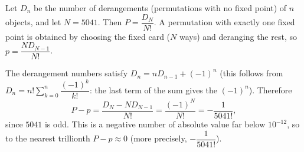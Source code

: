 Let $D_n$ be the number of derangements (permutations with no fixed point) of $n$ objects, and let $N=5041$. Then $P=\dfrac{D_N}{N!}$. A permutation with exactly one fixed point is obtained by choosing the fixed card ($N$ ways) and deranging the rest, so $p=\dfrac{N D_{N-1}}{N!}$.

The derangement numbers satisfy $D_n=nD_{n-1}+(-1)^n$ (this follows from $D_n=n!\sum_{k=0}^n\dfrac{(-1)^k}{k!}$: the last term of the sum gives the $(-1)^n$). Therefore
\[P-p=\dfrac{D_N-ND_{N-1}}{N!}=\dfrac{(-1)^N}{N!}=-\dfrac{1}{5041!},\]
since $5041$ is odd. This is a negative number of absolute value far below $10^{-12}$, so to the nearest trillionth $P-p\approx\boxed{0}$ (more precisely, $-\dfrac{1}{5041!}$).
